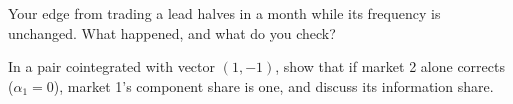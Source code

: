 \begin{interviewq}\label{iq:hf:lead-lag-and-cross-venue-trading:5}
Your edge from trading a lead halves in a month while its frequency is unchanged. What happened, and what do you check?
\end{interviewq}

\begin{interviewq}\label{iq:hf:lead-lag-and-cross-venue-trading:6}
In a pair cointegrated with vector $(1,-1)$, show that if market 2 alone corrects ($\alpha_1=0$), market 1's component share is one, and discuss its
information share.
\end{interviewq}
